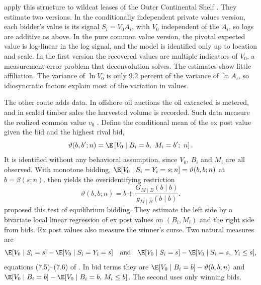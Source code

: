 \citet{LiPerrigneVuong2000} apply this structure to wildcat leases of the Outer Continental Shelf
\citep[p.~129]{HortacsuPerrigne2021}. They estimate two versions. In the conditionally independent
private values version, each bidder's value is its signal $S_i=V_0A_i$, with $V_0$ independent of the
$A_i$, so logs are additive as above. In the pure common value version, the pivotal expected value is
log-linear in the log signal, and the model is identified only up to location and scale. In the first
version the recovered values are multiple indicators of $V_0$, a measurement-error problem that
deconvolution solves. The estimates show little affiliation. The variance of $\ln V_0$ is only 9.2
percent of the variance of $\ln A_i$, so idiosyncratic factors explain most of the variation in values.

 The other route adds data. In offshore oil auctions the oil
extracted is metered, and in scaled timber sales the harvested volume is recorded. Such data measure the
realized common value $v_0$ \citep[Section~7.2.2]{AtheyHaile2007}. Define the conditional mean of the ex post
value given the bid and the highest rival bid,
\begin{equation}\label{eq:15-hpp-vartheta}
  \vartheta(b,b';n)=\E\left[V_0\mid B_i=b,\ M_i=b';\ n\right].
\end{equation}
It is identified without any behavioral assumption, since $V_0$, $B_i$ and $M_i$ are all observed. With
monotone bidding, $\E[V_0\mid S_i=Y_i=s;n]=\vartheta(b,b;n)$ at $b=\beta(s;n)$. 
then yields the overidentifying restriction
\begin{equation}\label{eq:15-hpp-test}
  \vartheta(b,b;n)=b+\frac{G_{M\mid B}(b\mid b)}{g_{M\mid B}(b\mid b)} .
\end{equation}
\citet{HendricksPinksePorter2003} proposed this test of equilibrium bidding. They estimate the left side by a
bivariate local linear regression of ex post values on $(B_i,M_i)$ and the right side from bids. Ex post values
also measure the winner's curse. Two natural measures are
\begin{equation*}
  \E[V_0\mid S_i=s]-\E[V_0\mid S_i=Y_i=s]
  \quad\text{and}\quad
  \E[V_0\mid S_i=s]-\E[V_0\mid S_i=s,\ Y_i\le s],
\end{equation*}
equations (7.5)--(7.6) of \citet{AtheyHaile2007}. In bid terms they are $\E[V_0\mid B_i=b]-\vartheta(b,b;n)$
and $\E[V_0\mid B_i=b]-\E[V_0\mid B_i=b,\,M_i\le b]$. The second uses only winning bids.

